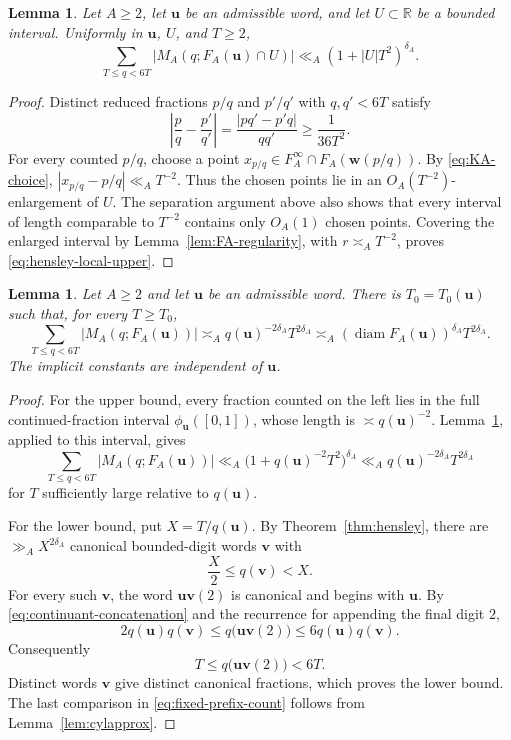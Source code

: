 \documentclass[11pt]{amsart}
\newtheorem{lemma}[theorem]{Lemma}
\newcommand{\R}{\mathbb R}
\newcommand{\diam}{\operatorname{diam}}
\begin{document}
\begin{lemma}\label{lem:local-rational-upper}
Let $A\ge2$, let $\mathbf{u}$ be an admissible word, and let $U\subset\R$ be a bounded
interval.  Uniformly in $\mathbf{u}$, $U$, and $T\ge2$,
\begin{equation}\label{eq:hensley-local-upper}
 \sum_{T\le q<6T}|M_A(q;F_A(\mathbf{u})\cap U)|
 \ll_A (1+|U|T^2)^{\delta_A}.
\end{equation}
\end{lemma}

\begin{proof}
Distinct reduced fractions $p/q$ and $p'/q'$ with $q,q'<6T$ satisfy
$$
 \left|\frac pq-\frac{p'}{q'}\right|
 =\frac{|pq'-p'q|}{qq'}\ge\frac1{36T^2}.
$$
For every counted $p/q$, choose a point
$x_{p/q}\in F_A^\infty\cap F_A(\mathbf{w}(p/q))$.  By
\eqref{eq:KA-choice}, $|x_{p/q}-p/q|\ll_A T^{-2}$.  Thus the chosen points lie
in an $O_A(T^{-2})$-enlargement of $U$.  The separation argument above also
shows that every interval of length comparable to $T^{-2}$ contains only
$O_A(1)$ chosen points.  Covering the enlarged interval by
Lemma~\ref{lem:FA-regularity}, with $r\asymp_A T^{-2}$, proves
\eqref{eq:hensley-local-upper}.
\end{proof}

\begin{lemma}\label{lem:fixed-prefix-count}
Let $A\ge2$ and let $\mathbf{u}$ be an admissible word.  There is
$T_0=T_0(\mathbf{u})$ such that, for every $T\ge T_0$,
\begin{equation}\label{eq:fixed-prefix-count}
 \sum_{T\le q<6T}|M_A(q;F_A(\mathbf{u}))|
 \asymp_A q(\mathbf{u})^{-2\delta_A}T^{2\delta_A}
 \asymp_A (\diam F_A(\mathbf{u}))^{\delta_A}T^{2\delta_A}.
\end{equation}
The implicit constants are independent of $\mathbf{u}$.
\end{lemma}

\begin{proof}
For the upper bound, every fraction counted on the left lies in the full
continued-fraction interval $\phi_{\mathbf{u}}([0,1])$, whose length is
$\asymp q(\mathbf{u})^{-2}$.  Lemma~\ref{lem:local-rational-upper}, applied to this
interval, gives
$$
 \sum_{T\le q<6T}|M_A(q;F_A(\mathbf{u}))|
 \ll_A \bigl(1+q(\mathbf{u})^{-2}T^2\bigr)^{\delta_A}
 \ll_A q(\mathbf{u})^{-2\delta_A}T^{2\delta_A}
$$
for $T$ sufficiently large relative to $q(\mathbf{u})$.

For the lower bound, put $X=T/q(\mathbf{u})$.  By
Theorem~\ref{thm:hensley}, there are $\gg_A X^{2\delta_A}$ canonical
bounded-digit words $\mathbf{v}$ with
$$
 \frac X2\le q(\mathbf{v})<X.
$$
For every such $\mathbf{v}$, the word $\mathbf{u}\mathbf{v}(2)$ is canonical and begins with $\mathbf{u}$.  By
\eqref{eq:continuant-concatenation} and the recurrence for appending the final
digit $2$,
$$
 2q(\mathbf{u})q(\mathbf{v})\le q\bigl(\mathbf{u}\mathbf{v}(2)\bigr)\le6q(\mathbf{u})q(\mathbf{v}).
$$
Consequently
$$
 T\le q\bigl(\mathbf{u}\mathbf{v}(2)\bigr)<6T.
$$
Distinct words $\mathbf{v}$ give distinct canonical fractions, which proves the lower
bound.  The last comparison in \eqref{eq:fixed-prefix-count} follows from
Lemma~\ref{lem:cylapprox}.
\end{proof}
\end{document}
